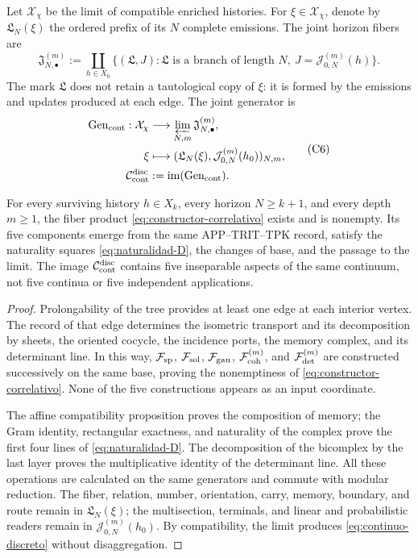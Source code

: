 Let \(\mathcal X_\chi\) be the limit of compatible enriched histories. For
\(\xi\in\mathcal X_\chi\), denote by \(\mathfrak L_N(\xi)\) the ordered
prefix of its \(N\) complete emissions. The joint horizon fibers
are
\[
 \mathfrak J_{N,\bullet}^{(m)}
 :=\coprod_{h\in X_0}
 \{(\mathfrak L,J):\mathfrak L\text{ is a branch of length }N,
       \ J=\mathcal J_{0,N}^{(m)}(h)\}.
 \tag{C5}
 \label{eq:fibras-conjuntas-horizonte}
\]
The mark \(\mathfrak L\) does not retain a tautological copy of \(\xi\): it is
formed by the emissions and updates produced at each edge. The
joint generator is
\[
\begin{aligned}
 \operatorname{Gen}_{\rm cont}:\mathcal X_\chi
   &\longrightarrow\varprojlim_{N,m}\mathfrak J_{N,\bullet}^{(m)},\\
 \xi&\longmapsto
   (\mathfrak L_N(\xi),\mathcal J_{0,N}^{(m)}(h_0))_{N,m},\\
 \mathcal C_{\rm cont}^{\rm disc}
   &:=\operatorname{im}(\operatorname{Gen}_{\rm cont}).
\end{aligned}
 \tag{C6}
 \label{eq:continuo-discreto}
\]

\begin{theorem}
\label{thm:correlacion-cinco}
For every surviving history \(h\in X_k\), every horizon
\(N\geq k+1\), and every depth \(m\geq1\), the fiber product
\eqref{eq:constructor-correlativo} exists and is nonempty. Its five
components emerge from the same APP--TRIT--TPK record, satisfy the
naturality squares \eqref{eq:naturalidad-D}, the changes of base, and the
passage to the limit. The image \(\mathcal C_{\rm cont}^{\rm disc}\) contains five
inseparable aspects of the same continuum, not five continua or five
independent applications.
\end{theorem}

\begin{proof}
Prolongability of the tree provides at least one edge at each interior
vertex. The record of that edge determines the isometric transport and its
decomposition by sheets, the oriented cocycle, the incidence ports, the
memory complex, and its determinant line. In this way,
\(\mathcal F_{\rm sp}\), \(\mathcal F_{\rm sol}\),
\(\mathcal F_{\rm gau}\), \(\mathcal F_{\rm coh}^{(m)}\), and
\(\mathcal F_{\rm det}^{(m)}\) are constructed successively on the same base, proving the
nonemptiness of \eqref{eq:constructor-correlativo}. None of the five
constructions appears as an input coordinate.

The affine compatibility proposition proves the composition of memory; the
Gram identity, rectangular exactness, and naturality of the complex
prove the first four lines of \eqref{eq:naturalidad-D}. The
decomposition of the bicomplex by the last layer proves the multiplicative
identity of the determinant line. All these operations are calculated
on the same generators and commute with modular reduction. The fiber,
relation, number, orientation, carry, memory, boundary, and
route remain in \(\mathfrak L_N(\xi)\); the multisection, terminals,
and linear and probabilistic readers remain in
\(\mathcal J_{0,N}^{(m)}(h_0)\). By compatibility, the limit produces
\eqref{eq:continuo-discreto} without disaggregation.
\end{proof}

